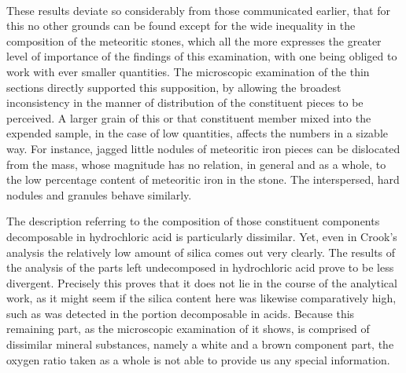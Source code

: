 \documentclass[a4paper, 12pt, oneside]{article}
\begin{document}
\paragraph*{}
These results deviate so considerably from those communicated earlier, that for this no other grounds can be found except for the wide inequality in the composition of the meteoritic stones, which all the more expresses the greater level of importance of the findings of this examination, with one being obliged to work with ever smaller quantities. The microscopic examination of the thin sections directly supported this supposition, by allowing the broadest inconsistency in the manner of distribution of the constituent pieces to be perceived. A larger grain of this or that constituent member mixed into the expended sample, in the case of low quantities, affects the numbers in a sizable way. For instance, jagged little nodules of meteoritic iron pieces can be dislocated from the mass, whose magnitude has no relation, in general and as a whole, to the low percentage content of meteoritic iron in the stone. The interspersed, hard nodules and granules behave similarly.

The description referring to the composition of those constituent components decomposable in hydrochloric acid is particularly dissimilar. Yet, even in Crook's analysis the relatively low amount of silica comes out very clearly. The results of the analysis of the parts left undecomposed in hydrochloric acid prove to be less divergent. Precisely this proves that it does not lie in the course of the analytical work, as it might seem if the silica content here was likewise comparatively high, such as was detected in the portion decomposable in acids. Because this remaining part, as the microscopic examination of it shows, is comprised of dissimilar mineral substances, namely a white and a brown component part, the oxygen ratio taken as a whole is not able to provide us any special information.
\end{document}
